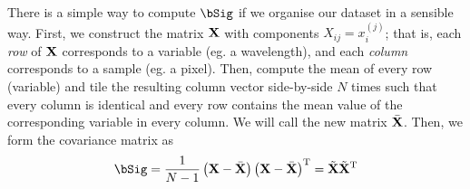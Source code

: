 \documentclass[12pt,a4paper]{tufte-handout}
\begin{document}
There is a simple way to compute $\bSig$ if we organise our dataset in a sensible way. First, we construct the matrix $\mathbf{X}$ with components $X_{ij} = x_i^{(j)}$; that is, each \textit{row} of $\mathbf{X}$ corresponds to a variable (eg. a wavelength), and each \textit{column} corresponds to a sample (eg. a pixel). Then, compute the mean of every row (variable) and tile the resulting column vector side-by-side $N$ times such that every column is identical and every row contains the mean value of the corresponding variable in every column. We will call the new matrix $\bar{\mathbf{X}}$. Then, we form the covariance matrix as
\begin{equation}
  \bSig = \frac{1}{N-1}\left(\bX-\bar\bX\right)\left(\bX-\bar\bX\right)^\rT = \tilde\bX\tilde\bX^\rT
\end{equation}
\end{document}
